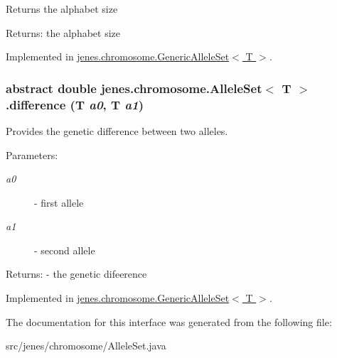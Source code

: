 Returns the alphabet size 

\begin{Desc}
\item[Returns:]the alphabet size \end{Desc}


Implemented in \hyperlink{classjenes_1_1chromosome_1_1_generic_allele_set_3_01_t_01_4_568ca617716496507d41e348c5bc2845}{jenes.chromosome.GenericAlleleSet$<$ T $>$}.\hypertarget{interfacejenes_1_1chromosome_1_1_allele_set_3_01_t_01_4_74ab0cb120fcfdee8e878727d6c50815}{
\subsubsection[difference]{\setlength{\rightskip}{0pt plus 5cm}abstract double jenes.chromosome.AlleleSet$<$ T $>$.difference (T {\em a0}, \/  T {\em a1})}}
\label{interfacejenes_1_1chromosome_1_1_allele_set_3_01_t_01_4_74ab0cb120fcfdee8e878727d6c50815}


Provides the genetic difference between two alleles.

\begin{Desc}
\item[Parameters:]
\begin{description}
\item[{\em a0}]- first allele \item[{\em a1}]- second allele \end{description}
\end{Desc}
\begin{Desc}
\item[Returns:]- the genetic difeerence \end{Desc}


Implemented in \hyperlink{classjenes_1_1chromosome_1_1_generic_allele_set_3_01_t_01_4_ce70b10ee535ccc3a7cbcd42739b8d5c}{jenes.chromosome.GenericAlleleSet$<$ T $>$}.

The documentation for this interface was generated from the following file:\begin{CompactItemize}
\item 
src/jenes/chromosome/AlleleSet.java\end{CompactItemize}
